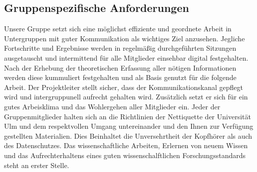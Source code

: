\documentclass{article}
\begin{document}
\subsection{Gruppenspezifische Anforderungen}
Unsere Gruppe setzt sich eine möglichst effiziente und geordnete Arbeit in Untergruppen mit guter Kommunikation als wichtiges Ziel anzusehen. Jegliche Fortschritte und Ergebnisse werden in regelmäßig durchgeführten Sitzungen ausgetauscht und intermittend für alle Mitglieder einsehbar digital festgehalten.
Nach der Erhebung der theoretischen Erfassung aller nötigen Informationen werden diese kummuliert festgehalten und als Basis genutzt für die folgende Arbeit. 
Der Projektleiter stellt sicher, dass der Kommunikationskanal gepflegt wird und intergruppunell aufrecht gehalten wird. Zusätzlich setzt er sich für ein gutes Arbeisklima und das Wohlergehen aller Mitglieder ein. Jeder der Gruppenmitglieder halten sich an die Richtlinien der Nettiquette der Universität Ulm und dem respektvollen Umgang untereinander und den Ihnen zur Verfügung gestellten Materialien. Dies Beinhaltet die Unversehrtheit der Kopfhörer als auch des Datenschutzes.
Das wissenschaftliche Arbeiten, Erlernen von neuem Wissen und das Aufrechterhaltens eines guten wissenschalftlichen Forschungsstandards steht an erster Stelle.
\end{document}
